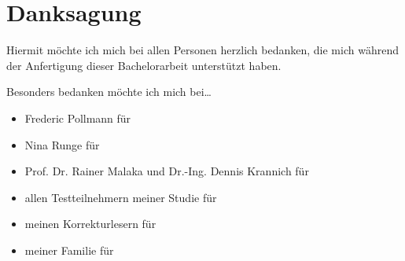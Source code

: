 \documentclass[a4paper,12pt,bibliography=totoc]{scrreprt}%
\begin{document}
\begin{appendix}

\end{appendix}

\chapter*{Danksagung}
Hiermit möchte ich mich bei allen Personen herzlich bedanken, die mich während der Anfertigung dieser Bachelorarbeit unterstützt haben.

Besonders bedanken möchte ich mich bei\dots
\begin{itemize}
\item Frederic Pollmann für
\item Nina Runge für
\item Prof. Dr. Rainer Malaka und Dr.-Ing. Dennis Krannich für
\item allen Testteilnehmern meiner Studie für
\item meinen Korrekturlesern für
\item meiner Familie für
\end{itemize}
\end{document}
